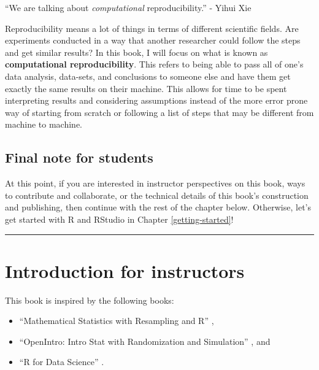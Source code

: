 \documentclass[
  12pt, krantz2,
]{krantz}
\providecommand{\tightlist}{%
  \setlength{\itemsep}{0pt}\setlength{\parskip}{0pt}}
\renewenvironment{quote}{\begin{VF}}{\end{VF}}
\begin{document}
\begin{quote}
``We are talking about \emph{computational} reproducibility.'' - Yihui Xie
\end{quote}

Reproducibility means a lot of things in terms of different scientific fields. Are experiments conducted in a way that another researcher could follow the steps and get similar results? In this book, I will focus on what is known as \textbf{computational reproducibility}. This refers to being able to pass all of one's data analysis, data-sets, and conclusions to someone else and have them get exactly the same results on their machine. This allows for time to be spent interpreting results and considering assumptions instead of the more error prone way of starting from scratch or following a list of steps that may be different from machine to machine.

\hypertarget{final-note-for-students}{%
\subsection{Final note for students}\label{final-note-for-students}}

At this point, if you are interested in instructor perspectives on this book, ways to contribute and collaborate, or the technical details of this book's construction and publishing, then continue with the rest of the chapter below. Otherwise, let's get started with R and RStudio in Chapter \ref{getting-started}!

\begin{center}\rule{0.5\linewidth}{\linethickness}\end{center}

\hypertarget{sec:intro-instructors}{%
\section{Introduction for instructors}\label{sec:intro-instructors}}

This book is inspired by the following books:

\begin{itemize}
\tightlist
\item
  ``Mathematical Statistics with Resampling and R'' \citep{hester2011},
\item
  ``OpenIntro: Intro Stat with Randomization and Simulation'' \citep{isrs2014}, and
\item
  ``R for Data Science'' \citep{rds2016}.
\end{itemize}
\end{document}
